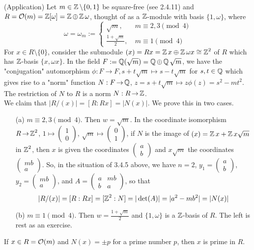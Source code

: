 \documentclass[11pt]{book}
\theoremstyle{definition}   \newtheorem{defn}[counter]{Definition} %
\newcommand{\bs}{\setminus}   \newcommand{\A}{\mathcal{A}}   \newcommand{\sy}{\textnormal{Syl}}   \newcommand{\size}[1]{\left| #1 \right|}
\newcommand{\mymatrix}[2]{\left( \begin{array}{#1} #2 \end{array} \right)}
\DeclareMathOperator{\ra}{\rightarrow}   \DeclareMathOperator{\Poly}{\mathbf{P}}   \DeclareMathOperator{\spn}{\textnormal{span}}   \DeclareMathOperator{\aut}{\textnormal{Aut}}
\newcommand{\vs}{\vspace{8pt}}
\numberwithin{counter}{chapter}
\begin{document}
\begin{remark}(Application)
Let $m \in \z \bs\{0,1\}$ be square-free (see 2.4.11) and $R = \mathcal{O}(m) = \operatorname{\mathbb{Z}}[\omega] = \operatorname{\mathbb{Z}} \oplus \operatorname{\mathbb{Z}}\omega$, thought of as a $\operatorname{\mathbb{Z}}$-module with basis $\{1,\omega\}$, where
	\[\omega = \omega_m := \begin{cases}
	\sqrt{m}, \quad & m \equiv 2,3 \pmod{4}\\
	\frac{1+\sqrt{m}}{2}, & m \equiv 1 \pmod{4}
	\end{cases} \]
For $x \in R\bs\{0\}$, consider the submodule $(x) = Rx = \operatorname{\mathbb{Z}} x \oplus \operatorname{\mathbb{Z}} \omega x \cong \operatorname{\mathbb{Z}}^2$ of $R$ which has $\operatorname{\mathbb{Z}}$-basis $\{x,\omega x\}$. In the field $F := \operatorname{\mathbb{Q}}(\sqrt{m}) = \operatorname{\mathbb{Q}} \oplus \operatorname{\mathbb{Q}} \sqrt{m}$, we have the "conjugation" automorphism $\phi : F \ra F, s+t \sqrt{m} \mapsto s-t\sqrt{m}$ for $s,t \in \operatorname{\mathbb{Q}}$ which gives rise to a "norm" function $N : F \ra \Q$, $z = s+t \sqrt{m} \mapsto z \phi(z) = s^2 - mt^2$. The restriction of $N$ to $R$ is a norm $N : R \ra \z$. \\

We claim that $|R/(x)| = [R : Rx] = |N(x)|$. We prove this in two cases.
\begin{enumerate}
\item[(a)] $m \equiv 2,3 \pmod{4}$. Then $w = \sqrt{m}$. In the coordinate isomorphism $R \ra \z^2$, $1 \mapsto \mymatrix{c}{1 \\ 0}$, $\sqrt{m} \mapsto \mymatrix{c}{0 \\ 1}$, if $N$ is the image of $(x) = \operatorname{\mathbb{Z}} x + \operatorname{\mathbb{Z}} x\sqrt{m}$ in $\operatorname{\mathbb{Z}}^2$, then $x$ is given the coordinates $\mymatrix{c}{a \\ b}$ and $x \sqrt{m}$ the coordinates $\mymatrix{c}{mb \\ a}$. So, in the situation of 3.4.5 above, we have $n = 2$, $y_1 = \mymatrix{c}{a \\ b}$, $y_2 = \mymatrix{c}{mb \\ a}$, and $A = \mymatrix{cc}{a & mb \\ b & a}$, so that
\[|R/(x)| = [R : Rx] = [\operatorname{\mathbb{Z}}^2 : N] = |\det(A)| = |a^2 - mb^2| = |N(x)| \]

\item[(b)] $m \equiv 1 \pmod{4}$. Then $w = \frac{1 + \sqrt{m}}{2}$ and $\{1,\omega\}$ is a $\operatorname{\mathbb{Z}}$-basis of $R$. The left is rest as an exercise.
\end{enumerate}
\end{remark}

\vs

\noindent {} If $x \in R = \mathcal{O}(m)$ and $N(x) = \pm p$ for a prime number $p$, then $x$ is prime in $R$. \\
\end{document}
